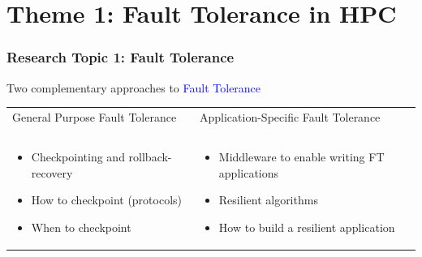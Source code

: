 \section[Fault Tolerance in HPC]{Theme 1: Fault Tolerance in HPC}

\begin{frame}
  \frametitle{Research Topic 1: Fault Tolerance}

  Two complementary approaches to \textcolor{blue}{Fault Tolerance}

  \bigskip

  \begin{tabular}{p{.45\linewidth}|p{.45\linewidth}}
    General Purpose Fault Tolerance     & Application-Specific Fault Tolerance \\
    &\\\hline
    &\\
    \begin{minipage}{\linewidth}
      \begin{itemize}
      \item Checkpointing and rollback-recovery
      \item How to checkpoint (protocols)
      \item When to checkpoint
      \end{itemize}
    \end{minipage} & \begin{minipage}{\linewidth}
      \begin{itemize}
      \item Middleware to enable writing FT applications
      \item Resilient algorithms
      \item How to build a resilient application
      \end{itemize}
    \end{minipage}
  \end{tabular}
\end{frame}


